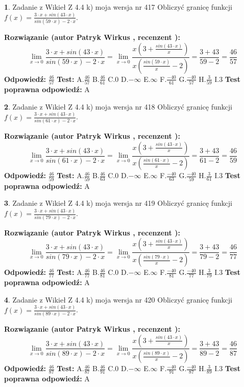 \documentclass[12pt, a4paper]{article}
\theoremstyle{definition} %
\newtheorem{zad}{}
\newcommand{\zadStart}[1]{\begin{zad}#1\newline}
\newcommand{\zadStop}{\end{zad}}
\newcommand{\rozwStart}[2]{\noindent \textbf{Rozwiązanie (autor #1 , recenzent #2): }\newline}
\newcommand{\rozwStop}{\newline}
\newcommand{\odpStart}{\noindent \textbf{Odpowiedź:}\newline}
\newcommand{\odpStop}{\newline}
\newcommand{\testStart}{\noindent \textbf{Test:}\newline}
\newcommand{\testStop}{\newline}
\newcommand{\kluczStart}{\noindent \textbf{Test poprawna odpowiedź:}\newline}
\newcommand{\kluczStop}{\newline}
\begin{document}
\zadStart{Zadanie z Wikieł Z 4.4 k) moja wersja nr 417}
Obliczyć granicę funkcji $f(x)=\frac{3\cdot x +sin(43\cdot x)}{sin(59\cdot x) -2\cdot x}$.
\zadStop
\rozwStart{Patryk Wirkus}{}
$$\lim\limits_{x\to 0}\frac{3\cdot x +sin(43\cdot x)}{sin(59\cdot x) -2\cdot x}
=\lim\limits_{x\to 0}\frac{x(3+\frac{sin(43\cdot x)}{x})}{x(\frac{sin(59\cdot x)}{x}-2)}
=\frac{3+43}{59-2} = \frac{46}{57}$$
\rozwStop
\odpStart
$\frac{46}{57}$
\odpStop
\testStart
A.$\frac{46}{57}$
B.$\frac{46}{61}$
C.$0$
D.$-\infty$
E.$\infty$
F.$\frac{-40}{61}$
G.$\frac{-40}{57}$
H.$\frac{3}{59}$
I.$3$
\testStop
\kluczStart
A
\kluczStop



\zadStart{Zadanie z Wikieł Z 4.4 k) moja wersja nr 418}
Obliczyć granicę funkcji $f(x)=\frac{3\cdot x +sin(43\cdot x)}{sin(61\cdot x) -2\cdot x}$.
\zadStop
\rozwStart{Patryk Wirkus}{}
$$\lim\limits_{x\to 0}\frac{3\cdot x +sin(43\cdot x)}{sin(61\cdot x) -2\cdot x}
=\lim\limits_{x\to 0}\frac{x(3+\frac{sin(43\cdot x)}{x})}{x(\frac{sin(61\cdot x)}{x}-2)}
=\frac{3+43}{61-2} = \frac{46}{59}$$
\rozwStop
\odpStart
$\frac{46}{59}$
\odpStop
\testStart
A.$\frac{46}{59}$
B.$\frac{46}{63}$
C.$0$
D.$-\infty$
E.$\infty$
F.$\frac{-40}{63}$
G.$\frac{-40}{59}$
H.$\frac{3}{61}$
I.$3$
\testStop
\kluczStart
A
\kluczStop



\zadStart{Zadanie z Wikieł Z 4.4 k) moja wersja nr 419}
Obliczyć granicę funkcji $f(x)=\frac{3\cdot x +sin(43\cdot x)}{sin(79\cdot x) -2\cdot x}$.
\zadStop
\rozwStart{Patryk Wirkus}{}
$$\lim\limits_{x\to 0}\frac{3\cdot x +sin(43\cdot x)}{sin(79\cdot x) -2\cdot x}
=\lim\limits_{x\to 0}\frac{x(3+\frac{sin(43\cdot x)}{x})}{x(\frac{sin(79\cdot x)}{x}-2)}
=\frac{3+43}{79-2} = \frac{46}{77}$$
\rozwStop
\odpStart
$\frac{46}{77}$
\odpStop
\testStart
A.$\frac{46}{77}$
B.$\frac{46}{81}$
C.$0$
D.$-\infty$
E.$\infty$
F.$\frac{-40}{81}$
G.$\frac{-40}{77}$
H.$\frac{3}{79}$
I.$3$
\testStop
\kluczStart
A
\kluczStop



\zadStart{Zadanie z Wikieł Z 4.4 k) moja wersja nr 420}
Obliczyć granicę funkcji $f(x)=\frac{3\cdot x +sin(43\cdot x)}{sin(89\cdot x) -2\cdot x}$.
\zadStop
\rozwStart{Patryk Wirkus}{}
$$\lim\limits_{x\to 0}\frac{3\cdot x +sin(43\cdot x)}{sin(89\cdot x) -2\cdot x}
=\lim\limits_{x\to 0}\frac{x(3+\frac{sin(43\cdot x)}{x})}{x(\frac{sin(89\cdot x)}{x}-2)}
=\frac{3+43}{89-2} = \frac{46}{87}$$
\rozwStop
\odpStart
$\frac{46}{87}$
\odpStop
\testStart
A.$\frac{46}{87}$
B.$\frac{46}{91}$
C.$0$
D.$-\infty$
E.$\infty$
F.$\frac{-40}{91}$
G.$\frac{-40}{87}$
H.$\frac{3}{89}$
I.$3$
\testStop
\kluczStart
A
\kluczStop
\end{document}
